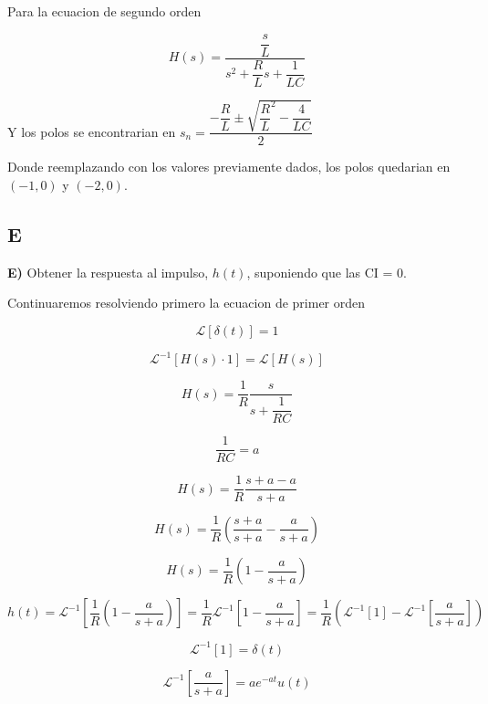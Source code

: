 Para la ecuacion de segundo orden 

$$H(s) = \dfrac{\dfrac{s}{L}}{s^2 + \dfrac{R}{L} s + \dfrac{1}{LC}}$$

Y los polos se encontrarian en $s_n=\dfrac{-\dfrac{R}{L} \pm \sqrt{\dfrac{R}{L}^2-\dfrac{4}{LC}}}{2}$

Donde reemplazando con los valores previamente dados, los polos quedarian en $(-1,0)$ y $(-2,0)$.

\begin{figure}[H]
  \centering
\end{figure}

\subsection{E}

\textbf{E)} Obtener la respuesta al impulso, $h(t)$, suponiendo que las CI = 0.

Continuaremos resolviendo primero la ecuacion de primer orden

$$\mathscr{L} [\delta (t)] = 1$$

$$\mathscr{L}^{-1} [H(s) \cdot 1] = \mathscr{L} [H(s)]$$

$$H(s) = \dfrac{1}{R} \dfrac{s}{s + \dfrac{1}{RC}}$$

$$\dfrac{1}{RC} = a$$

$$H(s) = \dfrac{1}{R} \dfrac{s + a - a}{s + a}$$

$$H(s) = \dfrac{1}{R} (\dfrac{s + a}{s + a} - \dfrac{a}{s + a})$$

$$H(s) = \dfrac{1}{R} (1 - \dfrac{a}{s + a})$$

$$h(t) = \mathscr{L}^{-1} [\dfrac{1}{R} (1 - \dfrac{a}{s + a})] = \dfrac{1}{R} \mathscr{L}^{-1} [1 - \dfrac{a}{s + a}] = \dfrac{1}{R} (\mathscr{L}^{-1} [1] - \mathscr{L}^{-1} [\dfrac{a}{s + a}])$$

$$\mathscr{L}^{-1} [1] = \delta (t) $$

$$\mathscr{L}^{-1} [\dfrac{a}{s + a}] = a e^{-at} u(t)$$

